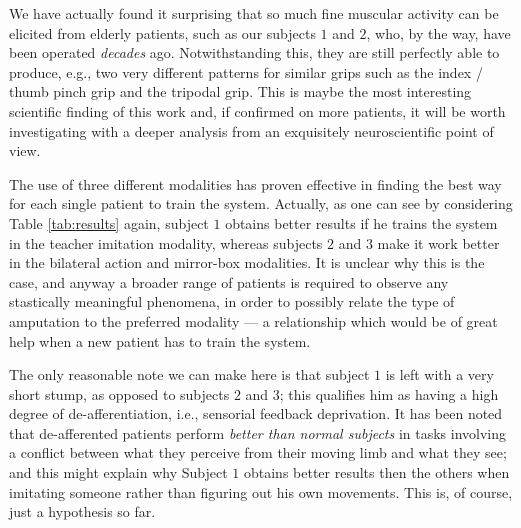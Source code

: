 We have actually found it surprising that so much fine muscular
activity can be elicited from elderly patients, such as our subjects
$1$ and $2$, who, by the way, have been operated \emph{decades}
ago. Notwithstanding this, they are still perfectly able to produce,
e.g., two very different patterns for similar grips such as the index
/ thumb pinch grip and the tripodal grip. This is maybe the most
interesting scientific finding of this work and, if confirmed on more
patients, it will be worth investigating with a deeper analysis from
an exquisitely neuroscientific point of view.

The use of three different modalities has proven effective in finding
the best way for each single patient to train the system. Actually, as
one can see by considering Table \ref{tab:results} again, subject $1$
obtains better results if he trains the system in the teacher
imitation modality, whereas subjects $2$ and $3$ make it work better
in the bilateral action and mirror-box modalities. It is unclear why
this is the case, and anyway a broader range of patients is required
to observe any stastically meaningful phenomena, in order to possibly
relate the type of amputation to the preferred modality --- a
relationship which would be of great help when a new patient has to
train the system.

The only reasonable note we can make here is that subject $1$ is left
with a very short stump, as opposed to subjects $2$ and $3$; this
qualifies him as having a high degree of de-afferentiation, i.e.,
sensorial feedback deprivation. It has been noted \cite{lajoie,miall}
that de-afferented patients perform \emph{better than normal subjects}
in tasks involving a conflict between what they perceive from their
moving limb and what they see; and this might explain why Subject $1$
obtains better results then the others when imitating someone rather
than figuring out his own movements. This is, of course, just a
hypothesis so far.
